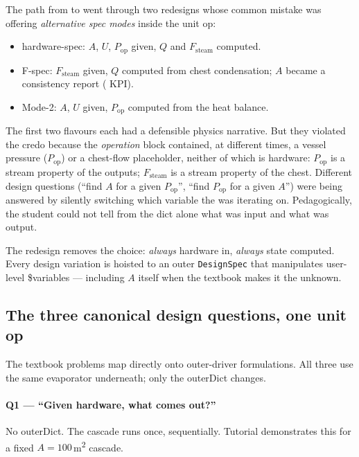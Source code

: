 \documentclass[11pt,a4paper]{article}
\begin{document}
The path from to went through two redesigns whose
common mistake was offering \emph{alternative spec modes} inside
the unit op:

\begin{itemize}[leftmargin=*,nosep,topsep=2pt]
  \item hardware-spec: $A$, $U$, $P_{\!\text{op}}$ given,
        $Q$ and $F_{\!\text{steam}}$ computed.
  \item F-spec: $F_{\!\text{steam}}$ given, $Q$ computed
        from chest condensation; $A$ became a consistency report
        ( KPI).
  \item Mode-2: $A$, $U$ given, $P_{\!\text{op}}$ computed
        from the heat balance.
\end{itemize}

\noindent The first two flavours each had a defensible physics
narrative.  But they violated the credo because the
\emph{operation} block contained, at different times, a vessel
pressure ($P_{\!\text{op}}$) or a chest-flow placeholder, neither
of which is hardware: $P_{\!\text{op}}$ is a stream property of
the outputs; $F_{\!\text{steam}}$ is a stream property of the
chest.  Different design questions (``find $A$ for a given
$P_{\!\text{op}}$'', ``find $P_{\!\text{op}}$ for a given $A$'')
were being answered by silently switching which variable the
 was iterating on.  Pedagogically, the student
could not tell from the dict alone what was input and what was
output.

The redesign removes the choice: \emph{always} hardware in,
\emph{always} state computed.  Every design variation is hoisted
to an outer \texttt{DesignSpec} that manipulates user-level
\$variables --- including $A$ itself when the textbook makes it
the unknown.

\subsection{The three canonical design questions, one unit op}

The textbook problems map directly onto outer-driver
formulations.  All three use the same evaporator
underneath; only the outerDict changes.

\paragraph{Q1 --- ``Given hardware, what comes out?''}
No outerDict.  The cascade runs once, sequentially.  Tutorial
 demonstrates this for
a fixed $A=100$\,m\textsuperscript{2} cascade.
\end{document}
